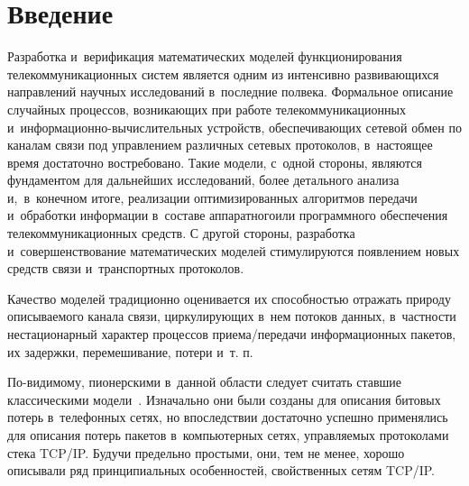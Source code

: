 

\vspace*{-4pt}


\thispagestyle{headings}

\begin{multicols}{2}

\label{st\stat}


\section{Введение} %

Разработка и~верификация математических моделей функционирования
телекоммуникационных систем является одним из интенсивно
разви\-ва\-ющих\-ся направлений научных исследований в~последние полвека.
Формальное описание случайных процессов, возникающих при работе
телекоммуникационных и~информационно-вы\-чис\-ли\-тель\-ных устройств,
обеспечивающих сетевой обмен по каналам связи под управлением
различных сетевых протоколов, в~настоящее время достаточно
востребовано. Такие модели, с~одной стороны, являются фундаментом
для дальнейших исследований, более детального анализа и,~в~конечном
итоге, реализации оптимизированных алгоритмов передачи и~обработки
информации в~составе аппаратного\linebreak или программного обеспечения
телекоммуникационных средств. С другой стороны, разработка 
и~совершенствова\-ние математических моделей стимулируются появлением
новых средств связи и~транспортных протоколов.

Качество моделей традиционно оценивается их способностью отражать
природу описываемого канала связи, циркулирующих в~нем потоков
данных, в~частности нестационарный характер процессов
при\-е\-ма/пе\-ре\-да\-чи информационных пакетов, их задержки, перемешивание,
потери и~т. п.

По-видимому, пионерскими в~данной об\-ласти следует считать ставшие
классическими модели~\cite{G_60, E_63}. Изначально они были
созданы для описания битовых потерь в~телефонных сетях, но
впоследствии достаточно успешно применялись для описания потерь
пакетов в~компьютерных сетях, управляемых протоколами стека TCP/IP.
Будучи предельно простыми, они, тем не менее, хорошо описывали ряд
принципиальных особенностей, свойственных сетям TCP/IP.


\end{multicols}
